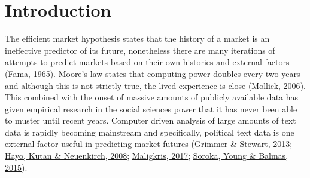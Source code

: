 \documentclass[11pt,preprint, authoryear]{elsarticle}
\numberwithin{equation}{section}
\numberwithin{figure}{section}
\numberwithin{table}{section}
\begin{document}
\headsep 35pt %




\listoffigures
\listoftables
\newpage

\hypertarget{introduction}{%
\section{\texorpdfstring{Introduction
\label{Introduction}}{Introduction }}\label{introduction}}

The efficient market hypothesis states that the history of a market is
an ineffective predictor of its future, nonetheless there are many
iterations of attempts to predict markets based on their own histories
and external factors (\protect\hyperlink{ref-famaEfficient}{Fama,
1965}). Moore's law states that computing power doubles every two years
and although this is not strictly true, the lived experience is close
(\protect\hyperlink{ref-mollick2006establishing}{Mollick, 2006}). This
combined with the onset of massive amounts of publicly available data
has given empirical research in the social sciences power that it has
never been able to muster until recent years. Computer driven analysis
of large amounts of text data is rapidly becoming mainstream and
specifically, political text data is one external factor useful in
predicting market futures
(\protect\hyperlink{ref-grimmer2013text}{Grimmer \& Stewart, 2013};
\protect\hyperlink{ref-hayo2008communicating}{Hayo, Kutan \& Neuenkirch,
2008}; \protect\hyperlink{ref-maligkris2017political}{Maligkris, 2017};
\protect\hyperlink{ref-soroka2015bad}{Soroka, Young \& Balmas, 2015}).
\end{document}
